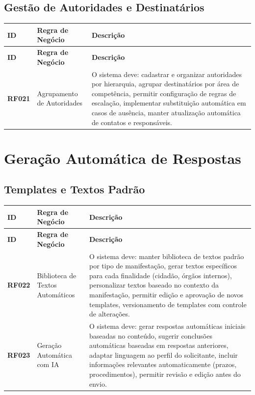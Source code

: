 \documentclass[12pt,a4paper]{article}
\newcommand{\rf}[1]{\textbf{\color{primaryblue}RF#1}}
\begin{document}
\subsection{Gestão de Autoridades e Destinatários}

\begin{longtable}{|p{2cm}|p{5cm}|p{8cm}|}
\hline
\textbf{ID} & \textbf{Regra de Negócio} & \textbf{Descrição} \\
\hline
\endfirsthead
\hline
\textbf{ID} & \textbf{Regra de Negócio} & \textbf{Descrição} \\
\hline
\endhead

\rf{021} & Agrupamento de Autoridades & O sistema deve: cadastrar e organizar autoridades por hierarquia, agrupar destinatários por área de competência, permitir configuração de regras de escalação, implementar substituição automática em casos de ausência, manter atualização automática de contatos e responsáveis. \\
\hline

\end{longtable}

\section{Geração Automática de Respostas}

\subsection{Templates e Textos Padrão}

\begin{longtable}{|p{2cm}|p{5cm}|p{8cm}|}
\hline
\textbf{ID} & \textbf{Regra de Negócio} & \textbf{Descrição} \\
\hline
\endfirsthead
\hline
\textbf{ID} & \textbf{Regra de Negócio} & \textbf{Descrição} \\
\hline
\endhead

\rf{022} & Biblioteca de Textos Automáticos & O sistema deve: manter biblioteca de textos padrão por tipo de manifestação, gerar textos específicos para cada finalidade (cidadão, órgãos internos), personalizar textos baseado no contexto da manifestação, permitir edição e aprovação de novos templates, versionamento de templates com controle de alterações. \\
\hline

\rf{023} & Geração Automática com IA & O sistema deve: gerar respostas automáticas iniciais baseadas no conteúdo, sugerir conclusões automáticas baseadas em respostas anteriores, adaptar linguagem ao perfil do solicitante, incluir informações relevantes automaticamente (prazos, procedimentos), permitir revisão e edição antes do envio. \\
\hline

\end{longtable}
\end{document}
